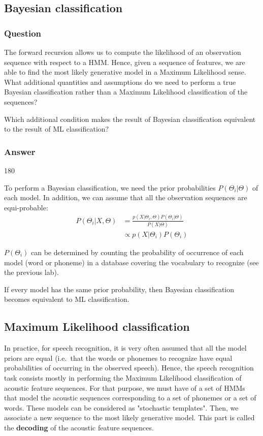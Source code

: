\documentclass[11pt]{article}
\newenvironment{answer}{\begin{turn}{180}\begin{minipage}[t]{\linewidth}\begin{itshape}}{\end{itshape}\end{minipage}\end{turn}}
\begin{document}
\subsection{Bayesian classification}
\label{sec:orgeb7df19}
\subsubsection{Question}
\label{sec:orgd985fae}
The forward recursion allows us to compute the likelihood of an
observation sequence with respect to a HMM. Hence, given a sequence of
features, we are able to find the most likely generative model in a
Maximum Likelihood sense. What additional quantities and assumptions do
we need to perform a true Bayesian classification rather than a Maximum
Likelihood classification of the sequences?

Which additional condition makes the result of Bayesian classification
equivalent to the result of ML classification?

\subsubsection{Answer}
\label{sec:orgf6eea71}
\begin{answer}
To perform a Bayesian classification, we need the prior probabilities
\(P(\Theta_i|\Theta)\) of each model. In addition, we can assume that all
the observation sequences are equi-probable:
\begin{align*}
P(\Theta_i|X,\Theta) &= \frac{p(X|\Theta_i,\Theta)
                    P(\Theta_i|\Theta)}{P(X|\Theta)}\\
 &\propto p(X|\Theta_i) P(\Theta_i)
\end{align*}

\(P(\Theta_i)\) can be determined by counting the
probability of occurrence of each model (word or phoneme) in a database
covering the vocabulary to recognize (see the previous lab).

If every model has the same prior probability, then Bayesian
classification becomes equivalent to ML classification.
\end{answer}

\subsection{Maximum Likelihood classification}
\label{sec:orgcaacc2c}
In practice, for speech recognition, it is very often assumed that all
the model priors are equal (i.e. that the words or phonemes to recognize
have equal probabilities of occurring in the observed speech). Hence,
the speech recognition task consists mostly in performing the Maximum
Likelihood classification of acoustic feature sequences. For that
purpose, we must have of a set of HMMs that model the acoustic sequences
corresponding to a set of phonemes or a set of words. These models can
be considered as "stochastic templates". Then, we associate a new
sequence to the most likely generative model. This part is called the
\textbf{decoding} of the acoustic feature sequences.
\end{document}
